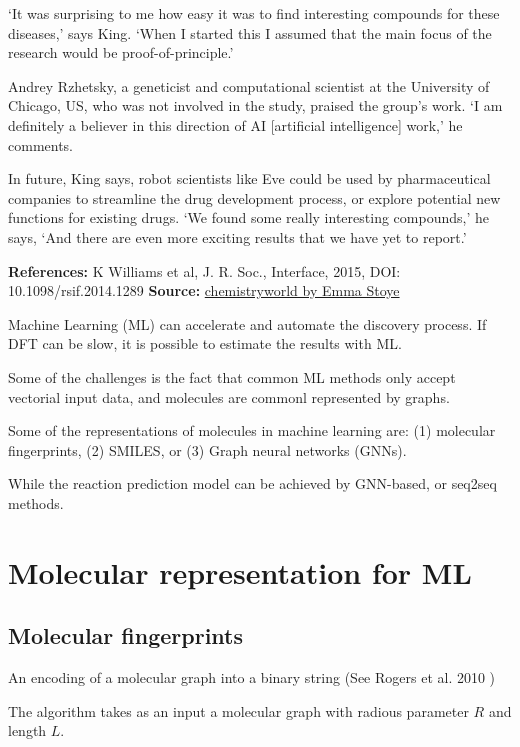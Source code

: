 \documentclass[b5paper]{report}
\begin{document}
\begin{mybox}
‘It was surprising to me how easy it was to find interesting compounds for
these diseases,’ says King. ‘When I started this I assumed that the main focus
of the research would be proof-of-principle.’

Andrey Rzhetsky, a geneticist and computational scientist at the University of
Chicago, US, who was not involved in the study, praised the group’s work. ‘I am
definitely a believer in this direction of AI [artificial intelligence] work,’
he comments.

In future, King says, robot scientists like Eve could be used by pharmaceutical
companies to streamline the drug development process, or explore potential new
functions for existing drugs. ‘We found some really interesting compounds,’ he
says, ‘And there are even more exciting results that we have yet to report.’

\textbf{References:}
K Williams et al, J. R. Soc., Interface, 2015, DOI: 10.1098/rsif.2014.1289
\textbf{Source:}
\href{https://www.chemistryworld.com/news/robot-scientist-speeds-up-drug-discovery/8230.article}{chemistryworld
by Emma Stoye}
\end{mybox}

Machine Learning (ML) can accelerate and automate the discovery process. If DFT can
be slow, it is possible to estimate the results with ML.

Some of the challenges is the fact that common ML methods only accept vectorial
input data, and molecules are commonl represented by graphs.

Some of the representations of molecules in machine learning are: (1) molecular
fingerprints, (2) SMILES, or (3) Graph neural networks (GNNs).

While the reaction prediction model can be achieved by \gls{GNN}-based, or seq2seq
methods.

\section{Molecular representation for ML}

\subsection{Molecular fingerprints}

An encoding of a molecular graph into a binary string (See Rogers et al. 2010
\cite{rogers2010extended})

The algorithm takes as an input a molecular graph with radious parameter $R$
and length $L$.
\end{document}
